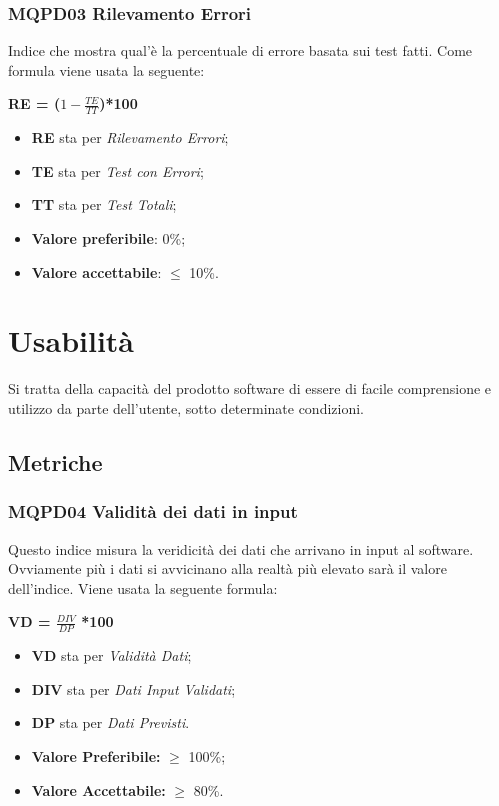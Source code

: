\subsubsection{MQPD03 Rilevamento Errori} \label{QualitàDelProdottoAffidabilitàMetricheMQPD03}
Indice che mostra qual’è la percentuale di errore basata sui test fatti. Come formula viene usata la seguente:
\begin{center}
	\textbf{RE = ($1-\frac{TE}{TT}$)*100}
\end{center}
\begin{itemize}
	\item \textbf{RE} sta per \textit{Rilevamento Errori};
	\item \textbf{TE} sta per \textit{Test con Errori};
	\item \textbf{TT} sta per \textit{Test Totali};
	\item \textbf{Valore preferibile}: 0\%;
	\item \textbf{Valore accettabile}: $\leq$ 10\%.
\end{itemize}

\section{Usabilità}\label{QualitàDelProdottoUsabilità}
Si tratta della capacità del prodotto software di essere di facile comprensione e utilizzo da parte dell’utente, sotto determinate condizioni.
\subsection{Metriche} \label{QualitàDelProdottoUsabilitàMetriche}
\subsubsection{MQPD04 Validità dei dati in input} \label{QualitàDelProdottoUsabilitàMetricheMQPD04}
Questo indice misura la veridicità dei dati che arrivano in input al software. Ovviamente più i dati si avvicinano alla realtà più elevato sarà il valore dell’indice.
Viene usata la seguente formula:
\begin{center}
	\textbf{VD = $\frac{DIV}{DP}$ *100}
\end{center}
\begin{itemize}
	\item \textbf{VD} sta per \textit{Validità Dati};
	\item \textbf{DIV} sta per \textit{Dati Input Validati};
	\item \textbf{DP} sta per \textit{Dati Previsti}.
\end{itemize}
\begin{itemize}
	\item \textbf{Valore Preferibile:} $\geq$ 100\%;
	\item \textbf{Valore  Accettabile:} $\geq$ 80\%.
\end{itemize}

